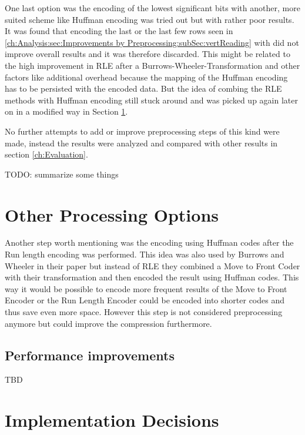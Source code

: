 {\begin{table}[H]
\end{table}
\par{
One last option was the encoding of the lowest significant bits with another, more suited scheme like Huffman encoding was tried out but with rather poor results. It was found that encoding the last or the last few rows seen in \ref{ch:Analysis:sec:Improvements by Preprocessing:subSec:vertReading} with did not improve overall results and it was therefore discarded. This might be related to the high improvement in RLE after a Burrows-Wheeler-Transformation and other factors like additional overhead because the mapping of the Huffman encoding has to be persisted with the encoded data. But the idea of combing the RLE methods with Huffman encoding still stuck around and was picked up again later on in a modified way in Section \ref{ch:Conceptual Design:sec:Postprocessing}. 
}

\par{
No further attempts to add or improve preprocessing steps of this kind were made, instead the results were analyzed and compared with other results in section \ref{ch:Evaluation}.

TODO: summarize some things
}
}
\section{Other Processing Options}
\label{ch:Conceptual Design:sec:Postprocessing}
Another step worth mentioning was the encoding using Huffman codes after the Run length encoding was performed. This idea was also used by Burrows and Wheeler in their paper \cite{Burrows94} but instead of RLE they combined a Move to Front Coder with their transformation and then encoded the result using Huffman codes. This way it would be possible to encode more frequent results of the Move to Front Encoder or the Run Length Encoder could be encoded into shorter codes and thus save even more space. However this step is not considered preprocessing anymore but could improve the compression furthermore.

\subsection{Performance improvements}
TBD
\section{Implementation Decisions}
\label{ch:Conceptual Design:sec:Implementation Decisions}

